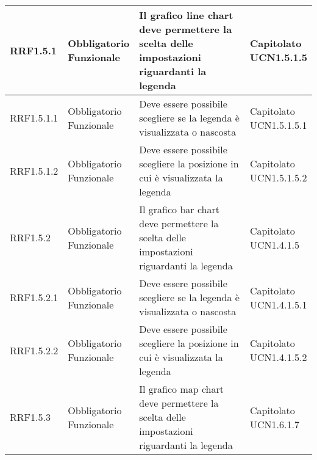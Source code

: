 \begin{longtabu}[c]{|X[0.7,l]|X[l]|X[2.5,l]|X[l]|}
                RRF1.5.1 & 
                \parbox[t]{4cm}{ Obbligatorio \\ Funzionale} & Il grafico line chart deve permettere la scelta delle impostazioni riguardanti la legenda & \parbox[t]{4cm}{Capitolato \\ UCN1.5.1.5 }  \\ 
                \hline
                
                RRF1.5.1.1 & 
                \parbox[t]{4cm}{ Obbligatorio \\ Funzionale} & Deve essere possibile scegliere se la legenda è visualizzata o nascosta & \parbox[t]{4cm}{Capitolato \\ UCN1.5.1.5.1 }  \\ 
                \hline
                
                RRF1.5.1.2 & 
                \parbox[t]{4cm}{ Obbligatorio \\ Funzionale} & Deve essere possibile scegliere la posizione in cui è visualizzata la legenda & \parbox[t]{4cm}{Capitolato \\ UCN1.5.1.5.2 }  \\ 
                \hline
                
                RRF1.5.2 & 
                \parbox[t]{4cm}{ Obbligatorio \\ Funzionale} & Il grafico bar chart deve permettere la scelta delle impostazioni riguardanti la legenda & \parbox[t]{4cm}{Capitolato \\ UCN1.4.1.5 }  \\ 
                \hline
                
                RRF1.5.2.1 & 
                \parbox[t]{4cm}{ Obbligatorio \\ Funzionale} & Deve essere possibile scegliere se la legenda è visualizzata o nascosta & \parbox[t]{4cm}{Capitolato \\ UCN1.4.1.5.1 }  \\ 
                \hline
                
                RRF1.5.2.2 & 
                \parbox[t]{4cm}{ Obbligatorio \\ Funzionale} & Deve essere possibile scegliere la posizione in cui è visualizzata la legenda & \parbox[t]{4cm}{Capitolato \\ UCN1.4.1.5.2 }  \\ 
                \hline
                
                RRF1.5.3 & 
                \parbox[t]{4cm}{ Obbligatorio \\ Funzionale} & Il grafico map chart deve permettere la scelta delle impostazioni riguardanti la legenda & \parbox[t]{4cm}{Capitolato \\ UCN1.6.1.7 }  \\ 
                \hline
                

\end{longtabu}
